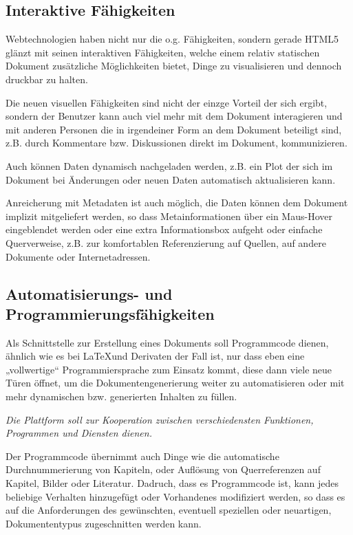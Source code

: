 \subsection{Interaktive Fähigkeiten}

Webtechnologien haben nicht nur die o.g. Fähigkeiten, sondern gerade
HTML5 glänzt mit seinen interaktiven Fähigkeiten, welche einem relativ
statischen Dokument zusätzliche Möglichkeiten bietet, Dinge zu
visualisieren und dennoch druckbar zu halten.

Die neuen visuellen Fähigkeiten sind nicht der einzge Vorteil der sich ergibt,
sondern der Benutzer kann auch viel mehr mit dem Dokument interagieren
und mit anderen Personen die in irgendeiner Form an dem Dokument beteiligt
sind, z.B. durch Kommentare bzw. Diskussionen direkt im Dokument,
kommunizieren.

Auch können Daten dynamisch nachgeladen werden, z.B. ein Plot der sich
im Dokument bei Änderungen oder neuen Daten automatisch aktualisieren kann.

Anreicherung mit Metadaten ist auch möglich, die Daten können dem Dokument
implizit mitgeliefert werden, so dass Metainformationen über ein Maus-Hover
eingeblendet werden oder eine extra Informationsbox aufgeht oder einfache
Querverweise, z.B. zur komfortablen Referenzierung auf Quellen,
auf andere Dokumente oder Internetadressen.

\subsection{Automatisierungs- und Programmierungsfähigkeiten}

Als Schnittstelle zur Erstellung eines Dokuments soll Programmcode
dienen, ähnlich wie es bei \LaTeX und Derivaten der Fall ist, nur
dass eben eine „vollwertige“ Programmiersprache zum Einsatz kommt, diese
dann viele neue Türen öffnet, um die Dokumentengenerierung weiter
zu automatisieren oder mit mehr dynamischen bzw. generierten Inhalten
zu füllen.

\emph{Die Plattform soll zur Kooperation zwischen verschiedensten
Funktionen, Programmen und Diensten dienen.}

Der Programmcode übernimmt auch Dinge wie die automatische Durchnummerierung
von Kapiteln, oder Auflösung von Querreferenzen auf Kapitel, Bilder oder
Literatur. Dadruch, dass es Programmcode ist, kann jedes beliebige Verhalten
hinzugefügt oder Vorhandenes modifiziert werden, so dass es auf die Anforderungen
des gewünschten, eventuell speziellen oder neuartigen, Dokumententypus
zugeschnitten werden kann.

